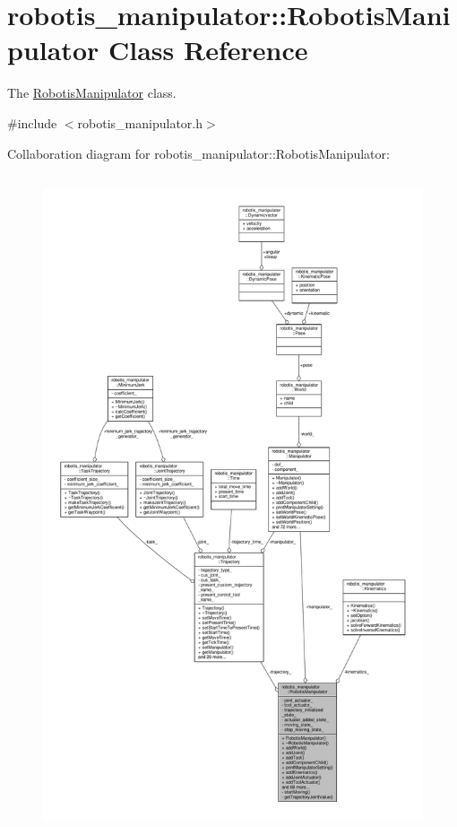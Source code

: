 \hypertarget{classrobotis__manipulator_1_1_robotis_manipulator}{}\section{robotis\+\_\+manipulator\+:\+:Robotis\+Manipulator Class Reference}
\label{classrobotis__manipulator_1_1_robotis_manipulator}


The \hyperlink{classrobotis__manipulator_1_1_robotis_manipulator}{Robotis\+Manipulator} class.  




{\ttfamily \#include $<$robotis\+\_\+manipulator.\+h$>$}



Collaboration diagram for robotis\+\_\+manipulator\+:\+:Robotis\+Manipulator\+:\nopagebreak
\begin{figure}[H]
\begin{center}
\leavevmode
\includegraphics[height=550pt]{classrobotis__manipulator_1_1_robotis_manipulator__coll__graph}
\end{center}
\end{figure}
